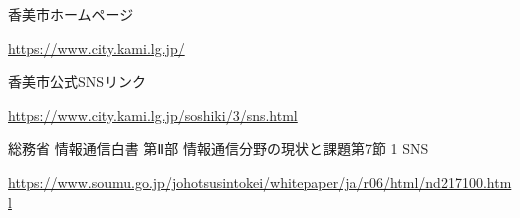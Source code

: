 \begin{thebibliography}{99}
     香美市ホームページ
    
    \url{https://www.city.kami.lg.jp/}
    
     香美市公式SNSリンク
    
    \url{https://www.city.kami.lg.jp/soshiki/3/sns.html}
    
     総務省 情報通信白書 第Ⅱ部 情報通信分野の現状と課題第7節 1 SNS
    
    \url{https://www.soumu.go.jp/johotsusintokei/whitepaper/ja/r06/html/nd217100.html}
\end{thebibliography}